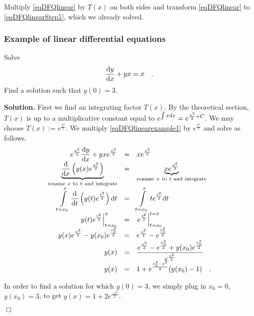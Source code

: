 \documentclass[12pt]{book}
\renewcommand{\optionalDisplay}[1]{}
\newenvironment{solution}{\medskip\noindent\textbf{Solution.} }{$\Box$}
\begin{document}
Multiply \eqref{eqDFQlinear} by $T(x)$ on both sides and transform \eqref{eqDFQlinear} to \eqref{eqDFQlinearStep1}, which we already solved.
\subsubsection{Example of linear differential equations}
Solve
\begin{equation}\label{eqDFQlinearexample1}
\frac{{\normalfont \text{d}} y}{{\normalfont \text{d}} x}+ y x=x\quad .
\end{equation} Find a solution such that $y(0)=3$.

\begin{solution}
First we find an integrating factor $T(x)$. By the theoretical section, $T(x)$ is up to a multiplicative constant equal to $e^{\int x {\normalfont \text{d}} x}= e^{\frac{x^2}2 +C}$. We may choose $T(x):= e^{\frac{x^2}2}$. We multiply \eqref{eqDFQlinearexample1} by $e^{\frac{x^2}2}$ and solve as follows.
\[
\begin{array}{rcl}
\displaystyle e^{\frac{x^2}2}\frac{{\normalfont \text{d}} y}{{\normalfont \text{d}} x}+ yxe^{\frac{x^2}2}&=&\displaystyle xe^{\frac{x^2}2}\\
\underbrace{\frac{{\normalfont \text{d}}}{{\normalfont \text{d}} x} \left(y(x) e^{\frac{x^2}2} \right)}_{\mathrm{rename~}x~\mathrm{to~}t\mathrm{~and~integrate}}&=&\underbrace{xe^{\frac{x^2}2}}_{\mathrm{rename~}x\mathrm{~to~}t\mathrm{~and~integrate}}\\
\displaystyle\int\limits_{t=x_0}^x \frac{{\normalfont \text{d}}}{{\normalfont \text{d}} t} \left(y(t) e^{\frac{t^2}2}\right) {\normalfont \text{d}} t &=&\displaystyle \int\limits_{t=x_0}^x  te^{\frac{t^2}2}{\normalfont \text{d}} t\\
\displaystyle\left.y(t) e^{\frac{t^2}2}\right|_{t=x_0}^x&=&\displaystyle \left.e^{\frac{t^2}2}\right|_{t=x_0}^{t=x}\\
\displaystyle y(x)e^{\frac{x^2}2}- y(x_0)e^{\frac{x_0^2}2}&=&\displaystyle e^{\frac{x^2}2}- e^{\frac{x_0^2}2}\\
y(x)&=&\displaystyle \frac{e^{\frac{x^2}2}- e^{\frac{x_0^2}2}+ y(x_0)e^{\frac{x_0^2}2}}{e^{\frac{x^2}2}}\\
y(x)&=&\displaystyle 1+{e^{\frac{x_0^2-x^2}2}}(y(x_0)-1)\quad.
\end{array}
\]

In order to find a solution for which $y(0)=3$, we simply plug in $x_0=0$, $y(x_0)=3$, to get $y(x)=1+2e^{\frac{-x^2}2}$.

\optionalDisplay{
\begin{pspicture}(-5,-5)(5,5)
\psaxes{<->}(0,0)(-5,-5)(5,5)
\newcommand{\Xstart}{1}
\newcommand{\Ystart}{1}
\psplot[linecolor=green]{-4}{4}{ 2.718281828 \Xstart\space \Xstart\space mul x x mul sub exp \Ystart\space 1 sub mul 1 add}
\renewcommand{\Xstart}{0}
\renewcommand{\Ystart}{-1}
\psplot[linecolor=green]{-4}{4}{ 2.718281828 \Xstart\space \Xstart\space mul x x mul sub exp \Ystart\space 1 sub mul 1 add}
\renewcommand{\Xstart}{0}
\renewcommand{\Ystart}{3}
\psplot[linecolor=green]{-4}{4}{ 2.718281828 \Xstart\space \Xstart\space mul x x mul sub exp \Ystart\space 1 sub mul 1 add}


\end{pspicture}}
\end{solution}
\end{document}
